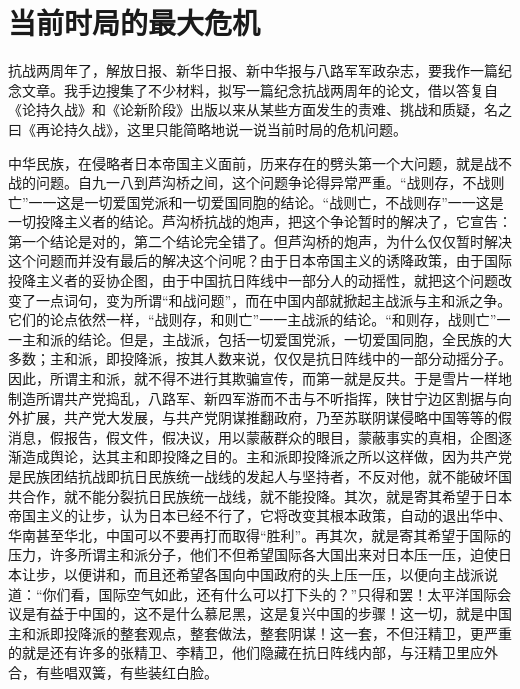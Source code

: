 \section[当前时局的最大危机（一九三九年六月三十日）]{当前时局的最大危机}


抗战两周年了，解放日报、新华日报、新中华报与八路军军政杂志，要我作一篇纪念文章。我手边搜集了不少材料，拟写一篇纪念抗战两周年的论文，借以答复自《论持久战》和《论新阶段》出版以来从某些方面发生的责难、挑战和质疑，名之曰《再论持久战》，这里只能简略地说一说当前时局的危机问题。

中华民族，在侵略者日本帝国主义面前，历来存在的劈头第一个大问题，就是战不战的问题。自九一八到芦沟桥之间，这个问题争论得异常严重。“战则存，不战则亡”一一这是一切爱国党派和一切爱国同胞的结论。“战则亡，不战则存”一一这是一切投降主义者的结论。芦沟桥抗战的炮声，把这个争论暂时的解决了，它宣告：第一个结论是对的，第二个结论完全错了。但芦沟桥的炮声，为什么仅仅暂时解决这个问题而并没有最后的解决这个问呢？由于日本帝国主义的诱降政策，由于国际投降主义者的妥协企图，由于中国抗日阵线中一部分人的动摇性，就把这个问题改变了一点词句，变为所谓“和战问题”，而在中国内部就掀起主战派与主和派之争。它们的论点依然一样，“战则存，和则亡”一一主战派的结论。“和则存，战则亡”一一主和派的结论。但是，主战派，包括一切爱国党派，一切爱国同胞，全民族的大多数；主和派，即投降派，按其人数来说，仅仅是抗日阵线中的一部分动摇分子。因此，所谓主和派，就不得不进行其欺骗宣传，而第一就是反共。于是雪片一样地制造所谓共产党捣乱，八路军、新四军游而不击与不听指挥，陕甘宁边区割据与向外扩展，共产党大发展，与共产党阴谋推翻政府，乃至苏联阴谋侵略中国等等的假消息，假报告，假文件，假决议，用以蒙蔽群众的眼目，蒙蔽事实的真相，企图逐渐造成舆论，达其主和即投降之目的。主和派即投降派之所以这样做，因为共产党是民族团结抗战即抗日民族统一战线的发起人与坚持者，不反对他，就不能破坏国共合作，就不能分裂抗日民族统一战线，就不能投降。其次，就是寄其希望于日本帝国主义的让步，认为日本已经不行了，它将改变其根本政策，自动的退出华中、华南甚至华北，中国可以不要再打而取得“胜利”。再其次，就是寄其希望于国际的压力，许多所谓主和派分子，他们不但希望国际各大国出来对日本压一压，迫使日本让步，以便讲和，而且还希望各国向中国政府的头上压一压，以便向主战派说道：“你们看，国际空气如此，还有什么可以打下头的？”只得和罢！太平洋国际会议是有益于中国的，这不是什么慕尼黑，这是复兴中国的步骤！这一切，就是中国主和派即投降派的整套观点，整套做法，整套阴谋！这一套，不但汪精卫，更严重的就是还有许多的张精卫、李精卫，他们隐藏在抗日阵线内部，与汪精卫里应外合，有些唱双簧，有些装红白脸。


